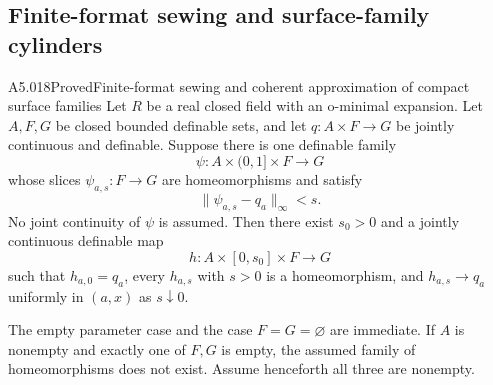 \subsection{Finite-format sewing and surface-family cylinders}

\begin{saresult}{A5.018}{Proved}{Finite-format sewing and coherent approximation of compact surface families}
Let $R$ be a real closed field with an o-minimal expansion. Let $A,F,G$
be closed bounded definable sets, and let $q:A\times F\to G$ be jointly
continuous and definable. Suppose there is one definable family
\[
 \psi:A\times(0,1]\times F\to G
\]
whose slices $\psi_{a,s}:F\to G$ are homeomorphisms and satisfy
\[
 \|\psi_{a,s}-q_a\|_\infty<s.
 \tag{A5.18.1}
\]
No joint continuity of $\psi$ is assumed. Then there exist $s_0>0$ and
a jointly continuous definable map
\[
 h:A\times[0,s_0]\times F\to G
\]
such that $h_{a,0}=q_a$, every $h_{a,s}$ with $s>0$ is a homeomorphism,
and $h_{a,s}\to q_a$ uniformly in $(a,x)$ as $s\downarrow0$.

The empty parameter case and the case $F=G=\varnothing$ are immediate.
If $A$ is nonempty and exactly one of $F,G$ is empty, the assumed family
of homeomorphisms does not exist. Assume henceforth all three are nonempty.

\end{saresult}
